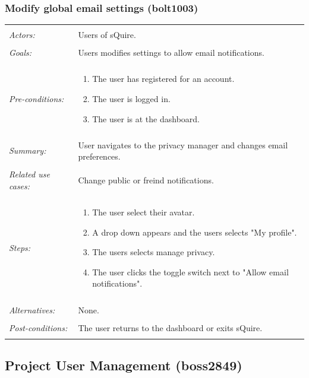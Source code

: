 \documentclass[11pt]{report}
\begin{document}
\subsubsection{Modify global email settings (bolt1003)}
\begin{tabular}{ p{2cm} p{12cm} }
 \hline
 \\
 \textit{Actors:} & Users of sQuire. \\ 
 \\
 \textit{Goals:} & Users modifies settings to allow email notifications. \\
 \\
 \textit{Pre-conditions:} & \begin{enumerate}
  \item The user has registered for an account.
  \item The user is logged in.
  \item The user is at the dashboard.
 \end{enumerate} \\
 \\
 \textit{Summary:} & User navigates to the privacy manager and changes email preferences.\\ 
 \\
 \textit{Related use cases:} & Change public or freind notifications. \\ 
 \\
 \textit{Steps:} & \begin{enumerate}
  \item The user select their avatar.
  \item A drop down appears and the users selects "My profile".
  \item The users selects manage privacy.
  \item The user clicks the toggle switch next to "Allow email notifications".
 \end{enumerate} \\
 \\
 \textit{Alternatives:} & None. \\
 \\
 \textit{Post-conditions:} & The user returns to the dashboard or exits sQuire. \\
 \\
\hline
\end{tabular}


\subsection{Project User Management (boss2849)}
\end{document}
